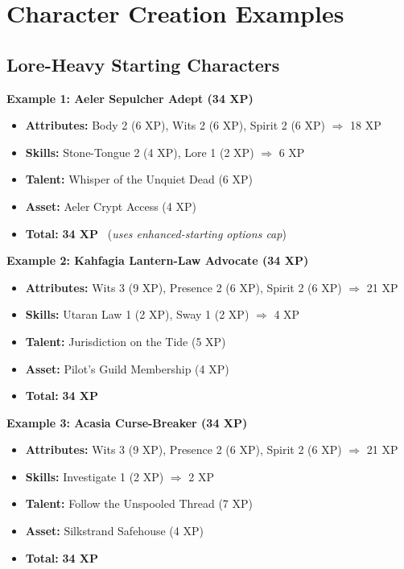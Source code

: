 \section{Character Creation Examples}
\label{sec:creation-examples}

\subsection{Lore-Heavy Starting Characters}
\label{subsec:starting-examples}

\textbf{Example 1: Aeler Sepulcher Adept (34 XP)}
\begin{itemize}
\item \textbf{Attributes:} Body 2 (6 XP), Wits 2 (6 XP), Spirit 2 (6 XP) \quad $\Rightarrow$ 18 XP
\item \textbf{Skills:} Stone-Tongue 2 (4 XP), Lore 1 (2 XP) \quad $\Rightarrow$ 6 XP
\item \textbf{Talent:} Whisper of the Unquiet Dead (6 XP)
\item \textbf{Asset:} Aeler Crypt Access (4 XP)
\item \textbf{Total:} \textbf{34 XP} \ (\emph{uses enhanced-starting options cap}) 
\end{itemize}

\textbf{Example 2: Kahfagia Lantern-Law Advocate (34 XP)}
\begin{itemize}
\item \textbf{Attributes:} Wits 3 (9 XP), Presence 2 (6 XP), Spirit 2 (6 XP) \quad $\Rightarrow$ 21 XP
\item \textbf{Skills:} Utaran Law 1 (2 XP), Sway 1 (2 XP) \quad $\Rightarrow$ 4 XP
\item \textbf{Talent:} Jurisdiction on the Tide (5 XP)
\item \textbf{Asset:} Pilot's Guild Membership (4 XP)
\item \textbf{Total:} \textbf{34 XP}
\end{itemize}

\textbf{Example 3: Acasia Curse-Breaker (34 XP)}
\begin{itemize}
\item \textbf{Attributes:} Wits 3 (9 XP), Presence 2 (6 XP), Spirit 2 (6 XP) \quad $\Rightarrow$ 21 XP
\item \textbf{Skills:} Investigate 1 (2 XP) \quad $\Rightarrow$ 2 XP
\item \textbf{Talent:} Follow the Unspooled Thread (7 XP)
\item \textbf{Asset:} Silkstrand Safehouse (4 XP)
\item \textbf{Total:} \textbf{34 XP}
\end{itemize}

